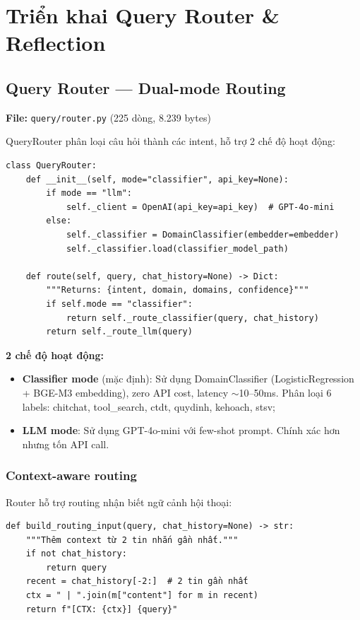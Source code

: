\documentclass[../DoAn.tex]{subfiles}
\begin{document}

\section{Triển khai Query Router \& Reflection}

\subsection{Query Router --- Dual-mode Routing}
\textbf{File:} \texttt{query/router.py} (225 dòng, 8.239 bytes)

QueryRouter phân loại câu hỏi thành các intent, hỗ trợ 2 chế độ hoạt động:
\begin{verbatim}
class QueryRouter:
    def __init__(self, mode="classifier", api_key=None):
        if mode == "llm":
            self._client = OpenAI(api_key=api_key)  # GPT-4o-mini
        else:
            self._classifier = DomainClassifier(embedder=embedder)
            self._classifier.load(classifier_model_path)

    def route(self, query, chat_history=None) -> Dict:
        """Returns: {intent, domain, domains, confidence}"""
        if self.mode == "classifier":
            return self._route_classifier(query, chat_history)
        return self._route_llm(query)
\end{verbatim}

\textbf{2 chế độ hoạt động:}
\begin{itemize}
    \item \textbf{Classifier mode} (mặc định): Sử dụng DomainClassifier (LogisticRegression + BGE-M3 embedding), zero API cost, latency $\sim$10--50ms. Phân loại 6 labels: chitchat, tool\_search, ctdt, quydinh, kehoach, stsv;
    \item \textbf{LLM mode}: Sử dụng GPT-4o-mini với few-shot prompt. Chính xác hơn nhưng tốn API call.
\end{itemize}

\subsubsection{Context-aware routing}
Router hỗ trợ routing nhận biết ngữ cảnh hội thoại:
\begin{verbatim}
def build_routing_input(query, chat_history=None) -> str:
    """Thêm context từ 2 tin nhắn gần nhất."""
    if not chat_history:
        return query
    recent = chat_history[-2:]  # 2 tin gần nhất
    ctx = " | ".join(m["content"] for m in recent)
    return f"[CTX: {ctx}] {query}"
\end{verbatim}
\end{document}
